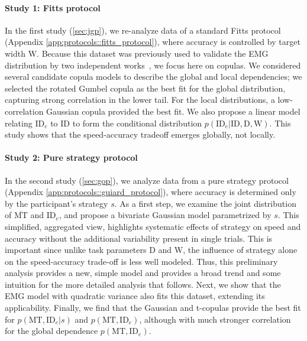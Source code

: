 \documentclass[acmlarge, manuscript,review]{acmart}
\newcommand{\mmt}{\ensuremath{\overline{\mt}}\xspace}
\newcommand{\mt}{\ensuremath{{\text{MT}}}\xspace}
\newcommand{\ide}{\ensuremath{{\text{ID}_e}}\xspace}
\newcommand{\D}{\ensuremath{{\text{D}}}\xspace}
\newcommand{\W}{\ensuremath{{\text{W}}}\xspace}
\begin{document}
\paragraph*{Study 1: Fitts protocol}
In the first study (\autoref{sec:jgp}), we re-analyze data of a standard Fitts protocol (Appendix \ref{app:protocols::fitts_protocol}), where accuracy is controlled by target width \W.
Because this dataset was previously used to validate the EMG distribution by two independent works~\cite{gori2018these,zhao2022}, we focus here on copulas.
We considered several candidate copula models to describe the global and local dependencies; we selected the rotated Gumbel copula as the best fit for the global distribution, capturing strong correlation in the lower tail.
For the local distributions, a low-correlation Gaussian copula provided the best fit.
We also propose a linear model relating \ide to ID to form the conditional distribution $p(\ide | \text{ID}, \D, \W)$. This study shows that the speed-accuracy tradeoff emerges globally, not locally.

\paragraph*{Study 2: Pure strategy protocol}
In the second study (\autoref{sec:gop}), we analyze data from a pure strategy protocol (Appendix \ref{app:protocols::guiard_protocol}), where accuracy is determined only by the participant's strategy $s$.
As a first step, we examine the joint distribution of \mmt and \ide,  and propose a bivariate Gaussian model parametrized by $s$.
This simplified, aggregated view, highlights systematic effects of strategy on speed and accuracy without the additional variability present in single trials. This is important since unlike task parameters D and W, the influence of strategy alone on the speed-accuracy trade-off is less well modeled.
Thus, this preliminary analysis provides a new, simple model and provides a broad trend and some intuition for the more detailed analysis that follows.
Next, we show that the EMG model with quadratic variance also fits this dataset, extending its applicability.
Finally, we find that the Gaussian and t-copulas provide the best fit for $p(\mt, \ide | s)$ and $p(\mt, \ide)$, although with much stronger correlation for the global dependence $p(\mt, \ide)$.
\end{document}
